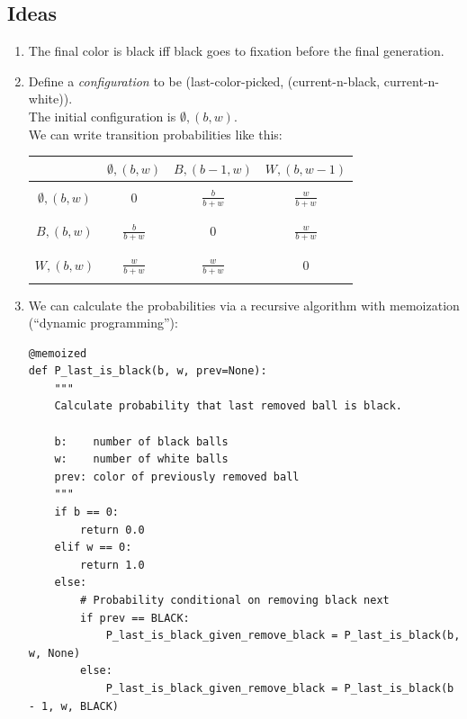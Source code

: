 \documentclass[12pt]{article}
\begin{document}
\subsection*{Ideas}
\begin{enumerate}
\item The final color is black iff black goes to fixation before the final generation.

\item Define a {\it configuration} to be (last-color-picked, (current-n-black, current-n-white)).\\
  The initial configuration is $\emptyset, (b, w)$.\\
  We can write transition probabilities like this:\\
  \begin{tabular}{|c|c|c|c|}
    \hline
                         & $\emptyset, (b, w)$ & $B, (b-1, w)$      & $W, (b, w-1)$ \\
    \hline
                         &                     &                    &\\
     $\emptyset, (b, w)$ & $0$                 & $\frac{b}{b + w}$  & $\frac{w}{b + w}$\\
                         &                     &                    &\\
    \hline
                         &                     &                    &\\
     $B,         (b, w)$ & $\frac{b}{b + w}$   & $0$                & $\frac{w}{b + w}$\\
                         &                     &                    &\\
    \hline
                         &                     &                    &\\
     $W,         (b, w)$ & $\frac{w}{b + w}$   & $\frac{w}{b + w}$  & $0$\\
                         &                     &                    &\\
    \hline
  \end{tabular}
\newpage
\item We can calculate the probabilities via a recursive algorithm with memoization (``dynamic
  programming''):

\begin{verbatim}
@memoized
def P_last_is_black(b, w, prev=None):
    """
    Calculate probability that last removed ball is black.

    b:    number of black balls
    w:    number of white balls
    prev: color of previously removed ball
    """
    if b == 0:
        return 0.0
    elif w == 0:
        return 1.0
    else:
        # Probability conditional on removing black next
        if prev == BLACK:
            P_last_is_black_given_remove_black = P_last_is_black(b,     w, None)
        else:
            P_last_is_black_given_remove_black = P_last_is_black(b - 1, w, BLACK)


\end{verbatim}
\end{enumerate}
\end{document}
